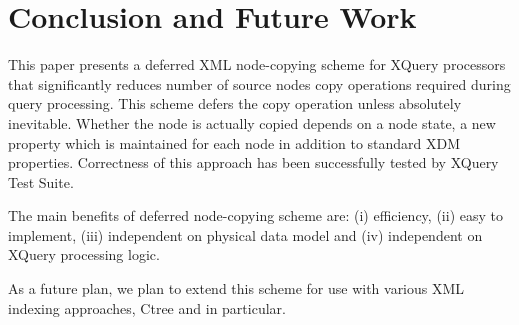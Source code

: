 \documentclass{llncs}
\begin{document}
\section{Conclusion and Future Work}
\label{sec:conclusion}

This paper presents a deferred XML node-copying scheme for XQuery
processors that significantly reduces number of source nodes copy 
operations required during query processing. This scheme defers the copy
operation unless absolutely inevitable. Whether the node is actually 
copied depends on a node state, a new property which is 
maintained for each node in addition to standard XDM properties. 
Correctness of this approach has been successfully tested by 
XQuery Test Suite. 

The main benefits of deferred node-copying scheme are: 
(i) efficiency, (ii) easy to implement, (iii) independent on
physical data model and (iv) independent on XQuery processing
logic.

As a future plan, we plan to extend this scheme for use with
various XML indexing approaches, Ctree \cite{Zou04a} and
\cite{Zou04b} in particular.

                     


\end{document}
